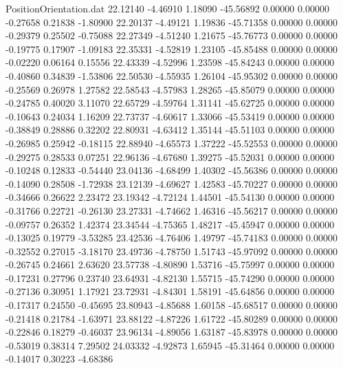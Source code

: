 \begin{filecontents}{PositionOrientation.dat}
  22.12140   -4.46910    1.18090   -45.56892    0.00000    0.00000   -0.27658    0.21838   -1.80900
  22.20137   -4.49121    1.19836   -45.71358    0.00000    0.00000   -0.29379    0.25502   -0.75088
  22.27349   -4.51240    1.21675   -45.76773    0.00000    0.00000   -0.19775    0.17907   -1.09183
  22.35331   -4.52819    1.23105   -45.85488    0.00000    0.00000   -0.02220    0.06164    0.15556
  22.43339   -4.52996    1.23598   -45.84243    0.00000    0.00000   -0.40860    0.34839   -1.53806
  22.50530   -4.55935    1.26104   -45.95302    0.00000    0.00000   -0.25569    0.26978    1.27582
  22.58543   -4.57983    1.28265   -45.85079    0.00000    0.00000   -0.24785    0.40020    3.11070
  22.65729   -4.59764    1.31141   -45.62725    0.00000    0.00000   -0.10643    0.24034    1.16209
  22.73737   -4.60617    1.33066   -45.53419    0.00000    0.00000   -0.38849    0.28886    0.32202
  22.80931   -4.63412    1.35144   -45.51103    0.00000    0.00000   -0.26985    0.25942   -0.18115
  22.88940   -4.65573    1.37222   -45.52553    0.00000    0.00000   -0.29275    0.28533    0.07251
  22.96136   -4.67680    1.39275   -45.52031    0.00000    0.00000   -0.10248    0.12833   -0.54440
  23.04136   -4.68499    1.40302   -45.56386    0.00000    0.00000   -0.14090    0.28508   -1.72938
  23.12139   -4.69627    1.42583   -45.70227    0.00000    0.00000   -0.34666    0.26622    2.23472
  23.19342   -4.72124    1.44501   -45.54130    0.00000    0.00000   -0.31766    0.22721   -0.26130
  23.27331   -4.74662    1.46316   -45.56217    0.00000    0.00000   -0.09757    0.26352    1.42374
  23.34544   -4.75365    1.48217   -45.45947    0.00000    0.00000   -0.13025    0.19779   -3.53285
  23.42536   -4.76406    1.49797   -45.74183    0.00000    0.00000   -0.32552    0.27015   -3.18170
  23.49736   -4.78750    1.51743   -45.97092    0.00000    0.00000   -0.26745    0.24661    2.63620
  23.57738   -4.80890    1.53716   -45.75997    0.00000    0.00000   -0.17231    0.27796    0.23740
  23.64931   -4.82130    1.55715   -45.74290    0.00000    0.00000   -0.27136    0.30951    1.17921
  23.72931   -4.84301    1.58191   -45.64856    0.00000    0.00000   -0.17317    0.24550   -0.45695
  23.80943   -4.85688    1.60158   -45.68517    0.00000    0.00000   -0.21418    0.21784   -1.63971
  23.88122   -4.87226    1.61722   -45.80289    0.00000    0.00000   -0.22846    0.18279   -0.46037
  23.96134   -4.89056    1.63187   -45.83978    0.00000    0.00000   -0.53019    0.38314    7.29502
  24.03332   -4.92873    1.65945   -45.31464    0.00000    0.00000   -0.14017    0.30223   -4.68386

\end{filecontents}
